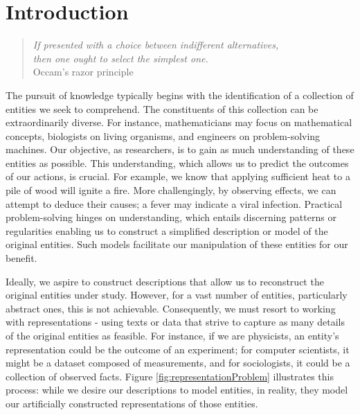 %
%


\chapter{Introduction}
\label{chap:Introduction}

\begin{quote}
\begin{flushright}
\emph{If presented with a choice between indifferent alternatives,\\
then one ought to select the simplest one.}\\
Occam’s razor principle 
\end{flushright}
\end{quote}
\bigskip

The pursuit of knowledge typically begins with the identification of a collection of entities we seek to comprehend. The constituents of this collection can be extraordinarily diverse. For instance, mathematicians may focus on mathematical concepts, biologists on living organisms, and engineers on problem-solving machines. Our objective, as researchers, is to gain as much understanding of these entities as possible. This understanding, which allows us to predict the outcomes of our actions, is crucial. For example, we know that applying sufficient heat to a pile of wood will ignite a fire. More challengingly, by observing effects, we can attempt to deduce their causes; a fever may indicate a viral infection. Practical problem-solving hinges on understanding, which entails discerning patterns or regularities enabling us to construct a simplified description or model of the original entities. Such models facilitate our manipulation of these entities for our benefit.

Ideally, we aspire to construct descriptions that allow us to reconstruct the original entities under study. However, for a vast number of entities, particularly abstract ones, this is not achievable. Consequently, we must resort to working with representations - using texts or data that strive to capture as many details of the original entities as feasible. For instance, if we are physicists, an entity's representation could be the outcome of an experiment; for computer scientists, it might be a dataset composed of measurements, and for sociologists, it could be a collection of observed facts. Figure \ref{fig:representationProblem} illustrates this process: while we desire our descriptions to model entities, in reality, they model our artificially constructed representations of those entities.

